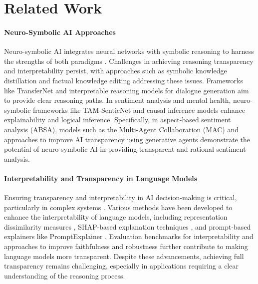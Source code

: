 \section{Related Work}
\label{sec:related}

\paragraph{Neuro-Symbolic AI Approaches}

Neuro-symbolic AI integrates neural networks with symbolic reasoning to harness the strengths of both paradigms \citep{Besold2017NeuralSymbolic, Garcez2023NeuroSymbolic}. Challenges in achieving reasoning transparency and interpretability persist, with approaches such as symbolic knowledge distillation \citep{west-etal-2022-symbolic} and factual knowledge editing \citep{de-cao-etal-2021-editing} addressing these issues. Frameworks like TransferNet \citep{shi-etal-2021-transfernet} and interpretable reasoning models for dialogue generation \citep{yang-etal-2022-interpretable} aim to provide clear reasoning paths. In sentiment analysis and mental health, neuro-symbolic frameworks like TAM-SenticNet \citep{dou2024tam} and causal inference models \citep{ding2024causal, ding2024neuro} enhance explainability and logical inference. Specifically, in aspect-based sentiment analysis (ABSA), models such as the Multi-Agent Collaboration (MAC) \citep{kang-etal-2024-tmak} and approaches to improve AI transparency using generative agents \citep{kang2024transparency} demonstrate the potential of neuro-symbolic AI in providing transparent and rational sentiment analysis.

\paragraph{Interpretability and Transparency in Language Models}

Ensuring transparency and interpretability in AI decision-making is critical, particularly in complex systems \citep{Lipton2018Mythos, Rudin2019StopExplaining}. Various methods have been developed to enhance the interpretability of language models, including representation dissimilarity measures \citep{brown-etal-2023-understanding}, SHAP-based explanation techniques \citep{mosca-etal-2022-shap}, and prompt-based explainers like PromptExplainer \citep{feng-etal-2024-promptexplainer}. Evaluation benchmarks for interpretability \citep{wang-etal-2022-fine} and approaches to improve faithfulness and robustness \citep{el-zini-awad-2022-beyond, horovicz-goldshmidt-2024-tokenshap, zhao-etal-2024-tapera} further contribute to making language models more transparent. Despite these advancements, achieving full transparency remains challenging, especially in applications requiring a clear understanding of the reasoning process.

